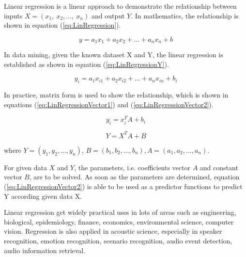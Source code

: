 \documentclass[runningheads,a4paper]{llncs}
\begin{document}
Linear regression is a linear approach to demonstrate the relationship between inputs $X=(x_1,\ x_2, \dots, \  x_n)$ and output $Y$. In mathematics, the relationship is shown in equation (\ref{eq:LinRegression})\cite{Colin15applied}.

\begin{equation}\label{eq:LinRegression}
    y=a_1x_1+a_2x_2+\dots+a_nx_n+b
\end{equation}\label{eq:LinRegression}

In data mining, given the known dataset X and Y, the linear regression is established as shown in equation (\ref{eq:LinRegressionY}).

\begin{equation}\label{eq:LinRegressionY}
    y_i=a_1x_{i1}+a_2x_{i2}+\dots+a_nx_{in}+b_i
\end{equation}\label{eq:LinRegressionY}

In practice, matrix form is used to show the relationship, which is shown in equations (\ref{eq:LinRegressionVector1}) and (\ref{eq:LinRegressionVector2}).

\begin{equation}\label{eq:LinRegressionVector1}
    y_i=x_i^TA+b_i
\end{equation}\label{eq:LinRegressionVector1}

\begin{equation}\label{eq:LinRegressionVector2}
    Y=X^TA+B
\end{equation}\label{eq:LinRegressionVector2}

where $Y=(y_1, y_2, \dots, y_n)$, $B=(b_1, b_2, \dots, b_n), A=(a_1, a_2, \dots, a_n)$. 

For given data $X$ and $Y$, the parameters, i.e. coefficients vector $A$ and constant vector $B$, are to be solved. As soon as the parameters are determined, equation (\ref{eq:LinRegressionVector2}) is able to be used as a predictor functions to predict Y according given data X. 

Linear regression get widely  practical uses in lots of areas such as engineering\cite{Rice04a}\cite{Vincent13determinants}, biological\cite{Vieira2016On}, epidemiology\cite{Paul13a}, finance\cite{Vincent13determinants}, economics\cite{Ehrenberg08}, environmental science\cite{piegorsch2005analyzing}, computer vision\cite{Xiujuan07locally}. Regression is also applied in acoustic science, especially in speaker recognition, emotion recognition, scenario recognition, audio event detection, audio information retrieval\cite{Alina14detecting}\cite{Zhao15invest}\cite{chen14linear}. 
\end{document}
